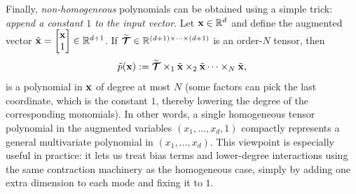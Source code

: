 \vspace{0.2cm}
\noindent
Finally, \emph{non-homogeneous} polynomials can be obtained using a simple trick: \emph{append a constant $1$ to the input vector}. Let $\mathbf{x}\in\mathbb{R}^d$ and define the augmented vector $\tilde{\mathbf{x}} =\begin{bmatrix}\mathbf{x}\\1\end{bmatrix}\in\mathbb{R}^{d+1}$. If $\widetilde{\bm{\mathcal{T}}}\in\mathbb{R}^{(d+1)\times\cdots\times(d+1)}$ is an order-$N$ tensor, then
\[
\tilde{p}(\mathbf{x})
:=
\widetilde{\bm{\mathcal{T}}} \times_{1}\tilde{\mathbf{x}}\times_{2}\tilde{\mathbf{x}}\cdots\times_{N}\tilde{\mathbf{x}},
\]
is a polynomial in $\mathbf{x}$ of degree at most $N$ (some factors can pick the last coordinate, which is the constant $1$, thereby lowering the degree of the corresponding monomials). In other words, a single homogeneous tensor polynomial in the augmented variables $(x_1,\dots,x_d,1)$ compactly represents a general multivariate polynomial in $(x_1,\dots,x_d)$. This viewpoint is especially useful in practice: it lets us treat bias terms and lower-degree interactions using the same contraction machinery as the homogeneous case, simply by adding one extra dimension to each mode and fixing it to $1$.  
